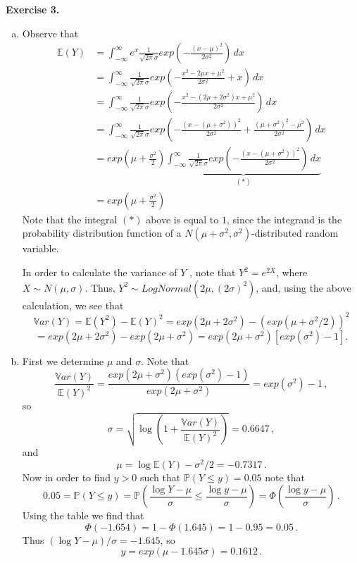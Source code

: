 \documentclass[11pt,a4paper]{report}
\begin{document}
\textbf{Exercise 3.}
\begin{enumerate}[(a)]
	\item Observe that
	\begin{align*}
		\mathbb{E}(Y)&=\int_{-\infty}^\infty e^x\frac{1}{\sqrt{2\pi}\sigma}exp\left(-\frac{(x-\mu)^2}{2\sigma^2}\right)\,dx\\
		&=\int_{-\infty}^\infty \frac{1}{\sqrt{2\pi}\sigma}exp\left(-\frac{x^2-2\mu x+\mu^2}{2\sigma^2}+x\right)\,dx\\
		&=\int_{-\infty}^\infty \frac{1}{\sqrt{2\pi}\sigma}exp\left(-\frac{x^2-(2\mu+2\sigma^2)x+\mu^2}{2\sigma^2}\right)\,dx\\
		&=\int_{-\infty}^\infty \frac{1}{\sqrt{2\pi}\sigma}exp\left(-\frac{(x-(\mu+\sigma^2))^2}{2\sigma^2}+\frac{(\mu+\sigma^2)^2-\mu^2}{2\sigma^2}\right)\,dx\\
		&=exp\left(\mu+\frac{\sigma^2}{2}\right)\underbrace{\int_{-\infty}^\infty \frac{1}{\sqrt{2\pi}\sigma}exp\left(-\frac{(x-(\mu+\sigma^2))^2}{2\sigma^2}\right)\,dx}_{(*)}\\
		&=exp\left(\mu+\frac{\sigma^2}{2}\right)
	\end{align*}
Note that the integral $(*)$ above is equal to $1$, since the integrand is the probability distribution function of a $N(\mu+\sigma^2,\sigma^2)$-distributed random variable.\par
In order to calculate the variance of $Y$ , note that $Y^2 = e^{2X}$, where $X\sim N(\mu,\sigma)$. Thus, $Y^2\sim LogNormal(2\mu,(2\sigma)^2)$, and, using the above calculation, we see that $$\mathbb{V}ar(Y)=\mathbb{E}(Y^2)-\mathbb{E}(Y)^2 = exp(2\mu+2\sigma^2)-(exp(\mu+\sigma^2/2))^2$$ $$=exp(2\mu+2\sigma^2)-exp(2\mu+\sigma^2)=exp(2\mu+\sigma^2)\left[exp(\sigma^2)-1\right].$$

	\item  First we determine $\mu$ and $\sigma$. Note that $$\frac{\mathbb{V}ar(Y)}{\mathbb{E}(Y)^2}=\frac{exp(2\mu+\sigma^2)(exp(\sigma^2)-1)}{exp(2\mu+\sigma^2)}=exp(\sigma^2)-1\, ,$$ so $$\sigma=\sqrt{\log\left(1+\frac{\mathbb{V}ar(Y)}{\mathbb{E}(Y)^2}\right)}=0.6647\, ,$$ and $$\mu = \log\mathbb{E}(Y)-\sigma^2/2=-0.7317\,.$$ Now in order to find $y>0$ such that $\mathbb{P}(Y\leq y)=0.05$ note that $$0.05 = \mathbb{P}(Y\leq y) = \mathbb{P}\left(\frac{\log Y-\mu}{\sigma}\leq \frac{\log y-\mu}{\sigma}\right)=\Phi\left(\frac{\log y-\mu}{\sigma}\right)\,.$$ Using the table we find that $$\Phi(-1.654) = 1-\Phi(1.645)=1-0.95=0.05\,.$$ Thus $(\log Y-\mu)/\sigma = -1.645$, so $$y = exp(\mu-1.645\sigma)=0.1612\, .$$
\end{enumerate}
\end{document}
